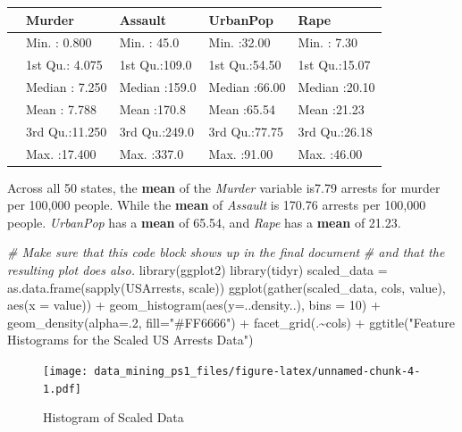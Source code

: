 \documentclass[
  12pt,
]{article}
\newenvironment{Shaded}{\begin{snugshade}}{\end{snugshade}}
\newcommand{\AttributeTok}[1]{\textcolor[rgb]{0.77,0.63,0.00}{#1}}
\newcommand{\CommentTok}[1]{\textcolor[rgb]{0.56,0.35,0.01}{\textit{#1}}}
\newcommand{\DecValTok}[1]{\textcolor[rgb]{0.00,0.00,0.81}{#1}}
\newcommand{\FunctionTok}[1]{\textcolor[rgb]{0.00,0.00,0.00}{#1}}
\newcommand{\NormalTok}[1]{#1}
\newcommand{\OtherTok}[1]{\textcolor[rgb]{0.56,0.35,0.01}{#1}}
\newcommand{\SpecialCharTok}[1]{\textcolor[rgb]{0.00,0.00,0.00}{#1}}
\newcommand{\StringTok}[1]{\textcolor[rgb]{0.31,0.60,0.02}{#1}}
\begin{document}
\begin{longtable}[]{@{}lllll@{}}
\toprule
& Murder & Assault & UrbanPop & Rape\tabularnewline
\midrule
\endhead
& Min. : 0.800 & Min. : 45.0 & Min. :32.00 & Min. : 7.30\tabularnewline
& 1st Qu.: 4.075 & 1st Qu.:109.0 & 1st Qu.:54.50 & 1st
Qu.:15.07\tabularnewline
& Median : 7.250 & Median :159.0 & Median :66.00 & Median
:20.10\tabularnewline
& Mean : 7.788 & Mean :170.8 & Mean :65.54 & Mean :21.23\tabularnewline
& 3rd Qu.:11.250 & 3rd Qu.:249.0 & 3rd Qu.:77.75 & 3rd
Qu.:26.18\tabularnewline
& Max. :17.400 & Max. :337.0 & Max. :91.00 & Max. :46.00\tabularnewline
\bottomrule
\end{longtable}

Across all 50 states, the \textbf{mean} of the \emph{Murder} variable
is7.79 arrests for murder per 100,000 people. While the \textbf{mean} of
\emph{Assault} is 170.76 arrests per 100,000 people. \emph{UrbanPop} has
a \textbf{mean} of 65.54, and \emph{Rape} has a \textbf{mean} of 21.23.

\begin{Shaded}
\begin{Highlighting}[]
\CommentTok{\# Make sure that this code block shows up in the final document}
\CommentTok{\# and that the resulting plot does also.}
\FunctionTok{library}\NormalTok{(ggplot2)}
\FunctionTok{library}\NormalTok{(tidyr)}
\NormalTok{scaled\_data }\OtherTok{=} \FunctionTok{as.data.frame}\NormalTok{(}\FunctionTok{sapply}\NormalTok{(USArrests, scale))}
\FunctionTok{ggplot}\NormalTok{(}\FunctionTok{gather}\NormalTok{(scaled\_data, cols, value), }\FunctionTok{aes}\NormalTok{(}\AttributeTok{x =}\NormalTok{ value)) }\SpecialCharTok{+} 
       \FunctionTok{geom\_histogram}\NormalTok{(}\FunctionTok{aes}\NormalTok{(}\AttributeTok{y=}\NormalTok{..density..), }\AttributeTok{bins =} \DecValTok{10}\NormalTok{) }\SpecialCharTok{+} 
       \FunctionTok{geom\_density}\NormalTok{(}\AttributeTok{alpha=}\NormalTok{.}\DecValTok{2}\NormalTok{, }\AttributeTok{fill=}\StringTok{"\#FF6666"}\NormalTok{) }\SpecialCharTok{+}
       \FunctionTok{facet\_grid}\NormalTok{(.}\SpecialCharTok{\textasciitilde{}}\NormalTok{cols) }\SpecialCharTok{+}
       \FunctionTok{ggtitle}\NormalTok{(}\StringTok{"Feature Histograms for the Scaled US Arrests Data"}\NormalTok{)}
\end{Highlighting}
\end{Shaded}

\begin{figure}
\centering
\texttt{[image: data\_mining\_ps1\_files/figure-latex/unnamed-chunk-4-1.pdf]}
\caption{Histogram of Scaled Data}
\end{figure}
\end{document}
